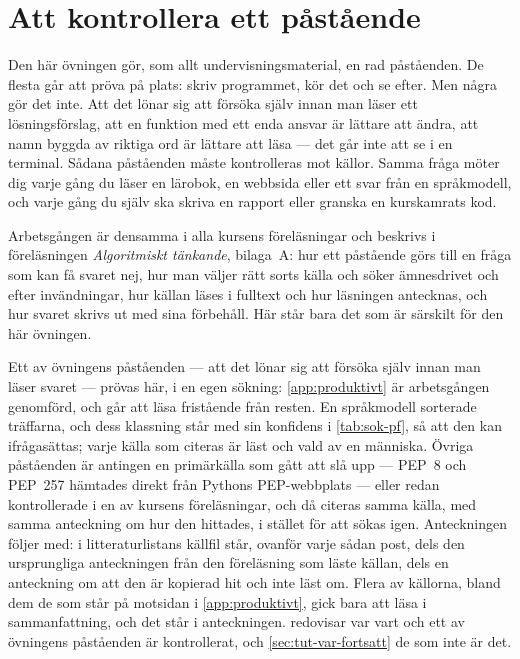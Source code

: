 
\chapter{Att kontrollera ett påstående}
\label{app:verifiera-ovning-funktioner}

Den här övningen gör, som allt undervisningsmaterial, en rad påståenden.
De flesta går att pröva på plats: skriv programmet, kör det och se efter.
Men några gör det inte.  Att det lönar sig att försöka själv innan man
läser ett lösningsförslag, att en funktion med ett enda ansvar är lättare
att ändra, att namn byggda av riktiga ord är lättare att läsa --- det går
inte att se i en terminal.  Sådana påståenden måste kontrolleras mot
källor.  Samma fråga möter dig varje gång du läser en lärobok, en
webbsida eller ett svar från en språkmodell, och varje gång du själv ska
skriva en rapport eller granska en kurskamrats kod.

Arbetsgången är densamma i alla kursens föreläsningar och beskrivs i
föreläsningen \emph{Algoritmiskt tänkande}, bilaga~A: hur ett påstående
görs till en fråga som kan få svaret nej, hur man väljer rätt sorts
källa och söker ämnesdrivet och efter invändningar, hur källan läses i
fulltext och hur läsningen antecknas, och hur svaret skrivs ut med sina
förbehåll.  Här står bara det som är särskilt för den här övningen.

Ett av övningens påståenden --- att det lönar sig att försöka själv
innan man läser svaret --- prövas här, i en egen sökning:
\cref{app:produktivt} är arbetsgången genomförd, och går att läsa
fristående från resten.  En språkmodell sorterade träffarna, och dess
klassning står med sin konfidens i \cref{tab:sok-pf}, så att den kan
ifrågasättas; varje källa som citeras är läst och vald av en människa.
Övriga påståenden är antingen en primärkälla som gått att slå upp ---
PEP~8 och PEP~257 hämtades direkt från Pythons PEP-webbplats --- eller
redan kontrollerade i en av kursens föreläsningar, och då citeras samma
källa, med samma anteckning om hur den hittades, i stället för att sökas
igen.  Anteckningen följer med: i litteraturlistans källfil står, ovanför
varje sådan post, dels den ursprungliga anteckningen från den
föreläsning som läste källan, dels en anteckning om att den är kopierad
hit och inte läst om.  Flera av källorna, bland dem de som står på
motsidan i \cref{app:produktivt}, gick bara att läsa i sammanfattning,
och det står i anteckningen.   redovisar
var vart och ett av övningens påståenden är kontrollerat, och
\cref{sec:tut-var-fortsatt} de som inte är det.

